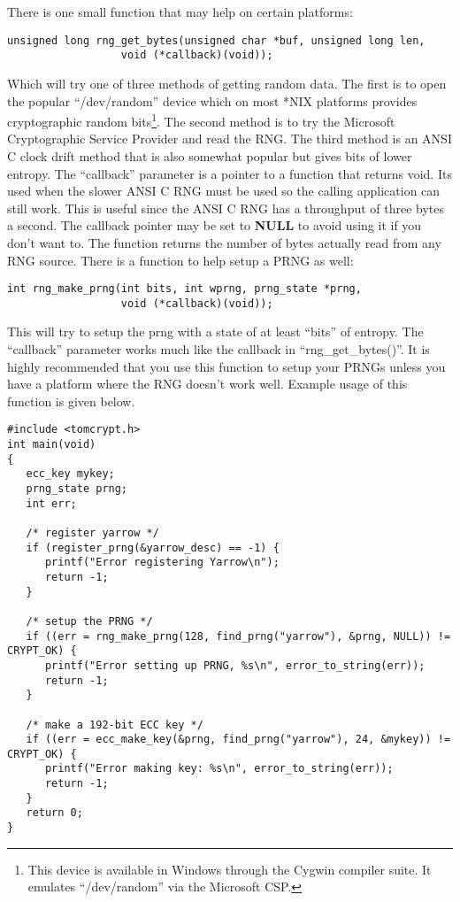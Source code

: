 \documentclass[a4paper]{book}
\begin{document}
There is one small function that may help on certain platforms:
\begin{verbatim}
unsigned long rng_get_bytes(unsigned char *buf, unsigned long len, 
                  void (*callback)(void));
\end{verbatim}

Which will try one of three methods of getting random data.  The first is to open the popular ``/dev/random'' device which 
on most *NIX platforms provides cryptographic random bits\footnote{This device is available in Windows through the Cygwin compiler suite.  It emulates ``/dev/random'' via the Microsoft CSP.}.  
The second method is to try the Microsoft Cryptographic Service Provider and read the RNG.  The third method is an ANSI C 
clock drift method that is also somewhat popular but gives bits of lower entropy.  The ``callback'' parameter is a pointer to a function that returns void.  Its used when the slower ANSI C RNG must be 
used so the calling application can still work.  This is useful since the ANSI C RNG has a throughput of three 
bytes a second.  The callback pointer may be set to {\bf NULL} to avoid using it if you don't want to.  The function 
returns the number of bytes actually read from any RNG source.  There is a function to help setup a PRNG as well:
\begin{verbatim}
int rng_make_prng(int bits, int wprng, prng_state *prng, 
                  void (*callback)(void));
\end{verbatim}
This will try to setup the prng with a state of at least ``bits'' of entropy.  The ``callback'' parameter works much like
the callback in ``rng\_get\_bytes()''.  It is highly recommended that you use this function to setup your PRNGs unless you have a
platform where the RNG doesn't work well.  Example usage of this function is given below.

\begin{small}
\begin{verbatim}
#include <tomcrypt.h>
int main(void)
{
   ecc_key mykey;
   prng_state prng;
   int err;

   /* register yarrow */
   if (register_prng(&yarrow_desc) == -1) {
      printf("Error registering Yarrow\n");
      return -1;
   }

   /* setup the PRNG */
   if ((err = rng_make_prng(128, find_prng("yarrow"), &prng, NULL)) != CRYPT_OK) {
      printf("Error setting up PRNG, %s\n", error_to_string(err));
      return -1;
   }

   /* make a 192-bit ECC key */
   if ((err = ecc_make_key(&prng, find_prng("yarrow"), 24, &mykey)) != CRYPT_OK) {
      printf("Error making key: %s\n", error_to_string(err));
      return -1;
   }
   return 0;
}
\end{verbatim}
\end{small}
\end{document}
